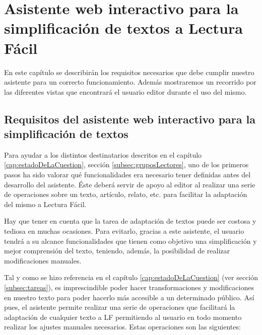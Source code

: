 \chapter{Asistente web interactivo para la simplificación de textos a Lectura Fácil}
\label{cap:asistenteWeb}



En este capítulo se describirán los requisitos necesarios que debe cumplir nuestro asistente para un correcto funcionamiento. Además mostraremos un recorrido por las diferentes vistas que encontrará el usuario editor durante el uso del mismo.



\section{Requisitos del asistente web interactivo para la simplificación de textos}\label{sec:requisitosAplicacion}

Para ayudar a los distintos destinatarios descritos en el capítulo \ref{cap:estadoDeLaCuestion}, sección \ref{subsec:gruposLectores}, uno de los primeros pasos ha sido valorar qué funcionalidades era necesario tener definidas antes del desarrollo del asistente. Éste deberá servir de apoyo al editor al realizar una serie de operaciones sobre un texto, artículo, relato, etc. para facilitar la adaptación del mismo a Lectura Fácil. 

Hay que tener en cuenta que la tarea de adaptación de textos puede ser costosa y tediosa en muchas ocasiones. Para evitarlo, gracias a este asistente, el usuario tendrá a su alcance funcionalidades que tienen como objetivo una simplificación y mejor comprensión del texto, teniendo, además, la posibilidad de realizar modificaciones manuales.

Tal y como se hizo referencia en el capítulo \ref{cap:estadoDeLaCuestion} (ver sección \ref{subsec:tareas}), es imprescindible poder hacer transformaciones y modificaciones en nuestro texto para poder hacerlo más accesible a un determinado público. Así pues, el asistente permite realizar una serie de operaciones que facilitará la adaptación de cualquier texto a LF permitiendo al usuario en todo momento realizar los ajustes manuales necesarios. Estas operaciones son las siguientes:

